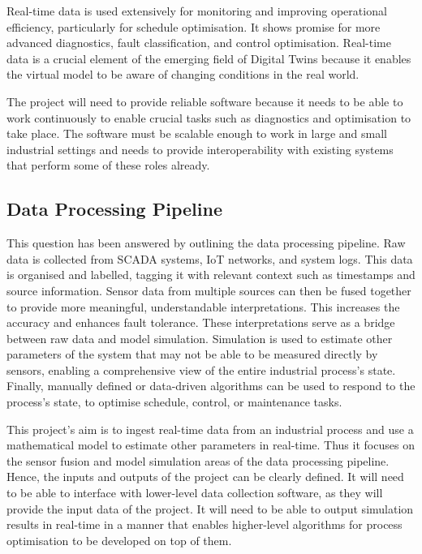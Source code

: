 Real-time data is used extensively for monitoring and improving operational efficiency, particularly for schedule optimisation. It shows promise for more advanced diagnostics, fault classification, and control optimisation. Real-time data is a crucial element of the emerging field of Digital Twins because it enables the virtual model to be aware of changing conditions in the real world.

The project will need to provide reliable software because it needs to be able to work continuously to enable crucial tasks such as diagnostics and optimisation to take place. The software must be scalable enough to work in large and small industrial settings and needs to provide interoperability with existing systems that perform some of these roles already.


\subsection{Data Processing Pipeline}

This question has been answered by outlining the data processing pipeline. Raw data is collected from SCADA systems, IoT networks, and system logs. 
This data is organised and labelled, tagging it with relevant context such as timestamps and source information. Sensor data from multiple sources can then be fused together to provide more meaningful, understandable interpretations. 
This increases the accuracy and enhances fault tolerance. 
These interpretations serve as a bridge between raw data and model simulation. Simulation is used to estimate other parameters of the system that may not be able to be measured directly by sensors, enabling a comprehensive view of the entire industrial process's state. 
Finally, manually defined or data-driven algorithms can be used to respond to the process's state, to optimise schedule, control, or maintenance tasks. 

This project's aim is to ingest real-time data from an industrial process and use a mathematical model to estimate other parameters in real-time. 
Thus it focuses on the sensor fusion and model simulation areas of the data processing pipeline. Hence, the inputs and outputs of the project can be clearly defined.
It will need to be able to interface with lower-level data collection software, as they will provide the input data of the project. 
It will need to be able to output simulation results in real-time in a manner that enables higher-level algorithms for process optimisation to be developed on top of them.

